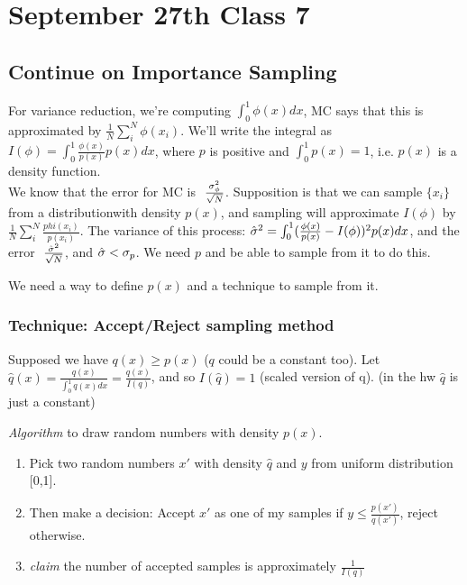 \pagebreak{}
\section{September 27th Class 7}
\label{sec:class7}

\subsection{Continue on Importance Sampling}
\label{sec:importancesampling}

For variance reduction, we're computing $\int_0^1\phi(x) dx$, MC says
that this is approximated by $\frac{1}{N}\sum_i^N\phi(x_i)$. We'll write the
integral as $I(\phi) = \int_0^1\frac{\phi(x)}{p(x)}p(x)dx$, where $p$ is
positive and $\int_0^1p(x) = 1$, i.e. $p(x)$ is a density function.\\

We know that the error for MC is
$~\frac{\sigma_{\phi}^2}{\sqrt{N}}$. Supposition is that we can sample
$\{x_i\}$ from a distributionwith density $p(x)$, and sampling will
approximate $I(\phi)$ by
$\frac{1}{N}\sum_i^N\frac{phi(x_i)}{p(x_i)}$. The variance of this
process: $\hat {\sigma}^2 = \int_0^1(\frac{\phi(x)}{p(x)} -
I(\phi))^2p(x)dx$, and the error $~ \frac{\hat {\sigma}^2}{\sqrt{N}}$, and
$\hat {\sigma} < \sigma_p$. We need $p$ and be able to sample from it to do
this.


We need a way to define $p(x)$ and a technique to sample from it. 

\subsubsection{Technique: Accept/Reject sampling method}
Supposed we have $q(x)\ge p(x)$ ($q$ could be a constant too).
Let $\hat q(x)= \frac{q(x)}{\int_0^1q(x)dx} = \frac{q(x)}{I(q)}$, and
so $I(\hat q) = 1$ (scaled version of q). (in the hw $\hat q$ is just
a constant)

\emph{Algorithm} to draw random numbers with density $p(x)$. 
\begin{enumerate}
\item Pick two random numbers $x'$ with density $\hat q$ and $y$ from
  uniform distribution [0,1].
\item Then make a decision: Accept $x'$ as one of my samples if $y\le \frac{p(x')}{q(x')}$,
  reject otherwise.
\item \emph{claim} the number of accepted samples is approximately $\frac{1}{I(q)}$
\end{enumerate}

